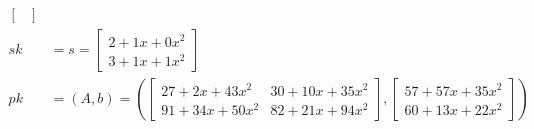 \begin{align*}
\begin{bmatrix}
         \end{bmatrix}                                                                         \\
  sk & = s =  \begin{bmatrix}2+ 1x + 0x^2 \\ 3+1x+1x^2 \end{bmatrix}                            \\
  pk & = (A, b) = \left (
  \begin{bmatrix}27+2x+43x^2 & 30+10x+35x^2 \\ 91+34x+50x^2 & 82+21x+94x^2 \end{bmatrix},
  \begin{bmatrix}
      57+57x+35x^2 \\
      60+13x+22x^2
    \end{bmatrix} \right )                                                                        \\
\end{align*}


